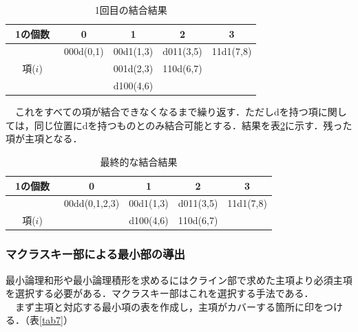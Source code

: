 \documentclass[11pt,a4paper]{jsarticle}
\begin{document}
\thispagestyle{fancy}
\cfoot{}
\begin{table}[H]
 \begin{center}
  \caption{1回目の結合結果}
  \label{tab5}
  \begin{tabular}{|c|c|c|c|c|} \hline
   1の個数　& 0 & 1 & 2 & 3 \\ \hline
           &000d(0,1) &00d1(1,3) &d011(3,5) &11d1(7,8) \\ 
  項($i$)  &          &001d(2,3) &110d(6,7) &          \\ 
           &          &d100(4,6) &          &          \\ \hline
  \end{tabular}
 \end{center}
\end{table}
　これをすべての項が結合できなくなるまで繰り返す．ただしdを持つ項に関しては，同じ位置にdを持つものとのみ結合可能とする．結果を表\ref{tab6}に示す．残った項が主項となる．
 \begin{table}[H]
  \centering
  \caption{最終的な結合結果}
  \label{tab6}
  \begin{tabular}{|c|c|c|c|c|} \hline
   1の個数　& 0 & 1 & 2 & 3 \\ \hline
           &00dd(0,1,2,3) &00d1(1,3) &d011(3,5) &11d1(7,8) \\ 
   項($i$) &              &d100(4,6) &110d(6,7) &          \\  \hline
  \end{tabular} 
 \end{table}

   \subsubsection{マクラスキー部による最小部の導出}
   最小論理和形や最小論理積形を求めるにはクライン部で求めた主項より必須主項を選択する必要がある．マクラスキー部はこれを選択する手法である．\\
   　まず主項と対応する最小項の表を作成し，主項がカバーする箇所に印をつける．（表\ref{tab7}）
\end{document}
